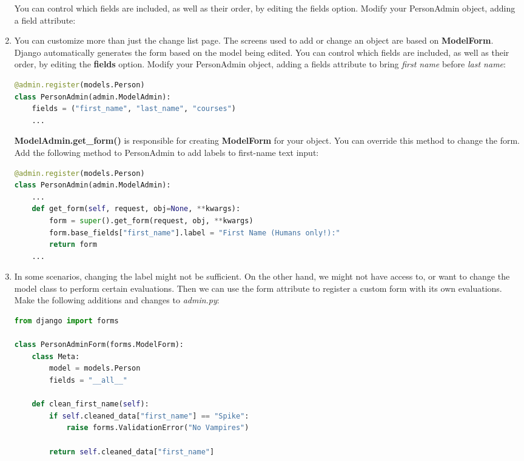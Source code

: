 \documentclass{homework}
\begin{document}
\begin{enumerate}[label=\roman*)]
You can control which fields are included, as well as their order, by editing the fields option. Modify your PersonAdmin object, adding a field attribute:
    \item You can customize more than just the change list page. The screens used to add or change an object are based on \textbf{ModelForm}. Django automatically generates the form based on the model being edited. You can control which fields are included, as well as their order, by editing the \textbf{fields} option. Modify your PersonAdmin object, adding a fields attribute to bring \textit{first name} before \textit{last name}:
    \begin{lstlisting}[language=python]
@admin.register(models.Person)
class PersonAdmin(admin.ModelAdmin):
    fields = ("first_name", "last_name", "courses")
    ...
\end{lstlisting}
    \textbf{ModelAdmin.get\_form()} is responsible for creating \textbf{ModelForm} for your object. You can override this method to change the form. Add the following method to PersonAdmin to add labels to first-name text input:
    \begin{lstlisting}[language=python]
@admin.register(models.Person)
class PersonAdmin(admin.ModelAdmin):
    ...
    def get_form(self, request, obj=None, **kwargs):
        form = super().get_form(request, obj, **kwargs)
        form.base_fields["first_name"].label = "First Name (Humans only!):"
        return form
    ...
\end{lstlisting}
    \item In some scenarios, changing the label might not be sufficient. On the other hand, we might not have access to, or want to change the model class to perform certain evaluations. Then we can use the form attribute to register a custom form with its own evaluations. Make the following additions and changes to \textit{admin.py}:
    \begin{lstlisting}[language=python]
from django import forms

class PersonAdminForm(forms.ModelForm):
    class Meta:
        model = models.Person
        fields = "__all__"

    def clean_first_name(self):
        if self.cleaned_data["first_name"] == "Spike":
            raise forms.ValidationError("No Vampires")

        return self.cleaned_data["first_name"]



\end{lstlisting}
\end{enumerate}
\end{document}
